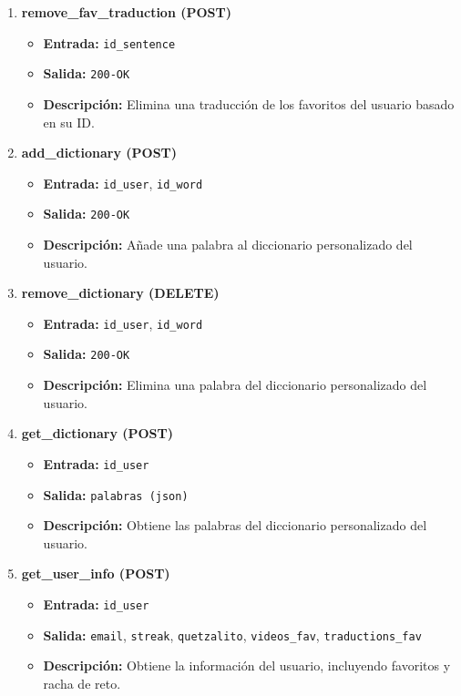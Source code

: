 \begin{enumerate}
     \item \textbf{remove\_fav\_traduction (POST)}
    \begin{itemize}
      \item \textbf{Entrada:} \texttt{id\_sentence}
        \item \textbf{Salida:} \texttt{200-OK}
        \item \textbf{Descripción:} Elimina una traducción de los favoritos del usuario basado en su ID.
    \end{itemize}

    \item \textbf{add\_dictionary (POST)}
    \begin{itemize}
        \item \textbf{Entrada:} \texttt{id\_user}, \texttt{id\_word}
        \item \textbf{Salida:} \texttt{200-OK}
        \item \textbf{Descripción:} Añade una palabra al diccionario personalizado del usuario.
    \end{itemize}

    \item \textbf{remove\_dictionary (DELETE)}
    \begin{itemize}
        \item \textbf{Entrada:} \texttt{id\_user}, \texttt{id\_word}
        \item \textbf{Salida:} \texttt{200-OK}
        \item \textbf{Descripción:} Elimina una palabra del diccionario personalizado del usuario.
    \end{itemize}

    \item \textbf{get\_dictionary (POST)}
    \begin{itemize}
        \item \textbf{Entrada:} \texttt{id\_user}
        \item \textbf{Salida:} \texttt{palabras (json)}
        \item \textbf{Descripción:} Obtiene las palabras del diccionario personalizado del usuario.
    \end{itemize}

    \item \textbf{get\_user\_info (POST)}
    \begin{itemize}
        \item \textbf{Entrada:} \texttt{id\_user}
        \item \textbf{Salida:} \texttt{email}, \texttt{streak}, \texttt{quetzalito}, \texttt{videos\_fav}, \texttt{traductions\_fav}
        \item \textbf{Descripción:} Obtiene la información del usuario, incluyendo favoritos y racha de reto.
    \end{itemize}


\end{enumerate}
